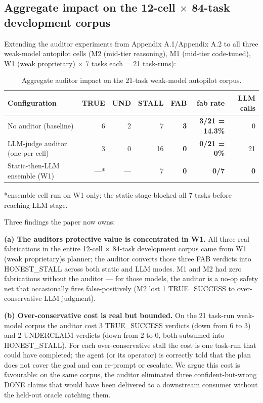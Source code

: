 \subsection{Aggregate impact on the 12-cell $\times$ 84-task development corpus}\label{app:aggregate-impact}
\label{aggregate-impact-on-the-weak-model-autopilot-corpus}

Extending the auditor experiments from Appendix A.1/Appendix A.2 to all three weak-model autopilot cells
(M2 (mid-tier reasoning), M1 (mid-tier code-tuned), W1 (weak proprietary) × 7 tasks each = 21 task-runs):

{\scriptsize\begin{longtable}[]{@{}lrrrrrr@{}}
\caption{Aggregate auditor impact on the 21-task weak-model autopilot corpus.}\label{tab:auditor-aggregate}\\
\toprule\noalign{}
Configuration & TRUE & UND & STALL & \textbf{FAB} & fab rate & LLM calls \\
\midrule\noalign{}
\endhead
\bottomrule\noalign{}
\endlastfoot
No auditor (baseline) & 6 & 2 & 7 & \textbf{3} & \textbf{3/21 = 14.3\%} & 0 \\
LLM-judge auditor (one per cell) & 3 & 0 & 16 & \textbf{0} & \textbf{0/21 = 0\%} & 21 \\
Static-then-LLM ensemble (W1) & ---* & --- & 7 & \textbf{0} & \textbf{0/7} & \textbf{0} \\
\end{longtable}}

*ensemble cell run on W1 only; the static stage blocked all 7 tasks before reaching LLM stage.

Three findings the paper now owns:

\textbf{(a) The auditor\textquotesingle s protective value is concentrated in W1.} All three real
fabrications in the entire 12-cell $\times$ 84-task development corpus came from W1 (weak proprietary)\textquotesingle s planner; the
auditor converts those three FAB verdicts into HONEST\_STALL across both static and LLM
modes. M1 and M2 had zero fabrications without the auditor --- for those models,
the auditor is a no-op safety net that occasionally fires false-positively (M2 lost
1 TRUE\_SUCCESS to over-conservative LLM judgment).

\textbf{(b) Over-conservative cost is real but bounded.} On the 21 task-run weak-model corpus
the auditor cost 3 TRUE\_SUCCESS verdicts (down from 6 to 3) and 2 UNDERCLAIM verdicts
(down from 2 to 0, both subsumed into HONEST\_STALL). For each over-conservative stall the
cost is one task-run that could have completed; the agent (or its operator) is correctly
told that the plan does not cover the goal and can re-prompt or escalate. We argue this
cost is favourable: on the same corpus, the auditor eliminated three confident-but-wrong
DONE claims that would have been delivered to a downstream consumer without the held-out
oracle catching them.

